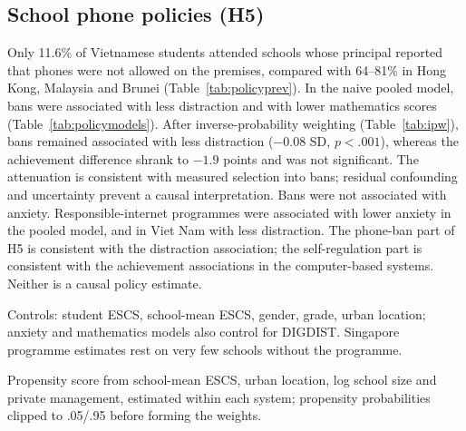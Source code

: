 \documentclass[preprint,12pt,authoryear,nonatbib]{elsarticle}
\begin{document}
\subsection{School phone policies (H5)}
Only 11.6\% of Vietnamese students attended schools whose principal reported that phones were not allowed on the premises, compared with 64--81\% in Hong Kong, Malaysia and Brunei (Table~\ref{tab:policyprev}). In the naive pooled model, bans were associated with less distraction and with lower mathematics scores (Table~\ref{tab:policymodels}). After inverse-probability weighting (Table~\ref{tab:ipw}), bans remained associated with less distraction ($-0.08$ SD, $p<.001$), whereas the achievement difference shrank to $-1.9$ points and was not significant. The attenuation is consistent with measured selection into bans; residual confounding and uncertainty prevent a causal interpretation. Bans were not associated with anxiety. Responsible-internet programmes were associated with lower anxiety in the pooled model, and in Viet Nam with less distraction. The phone-ban part of H5 is consistent with the distraction association; the self-regulation part is consistent with the achievement associations in the computer-based systems. Neither is a causal policy estimate.

\begin{table}[H]\centering\footnotesize
\caption{Students in schools with each device policy, PISA 2022 (\%)}\label{tab:policyprev}

\end{table}

\begin{table}[H]\centering\scriptsize
\caption{School policies and student outcomes, regression adjustment (SE in parentheses)}\label{tab:policymodels}

\par\smallskip\raggedright\footnotesize Controls: student ESCS, school-mean ESCS, gender, grade, urban location; anxiety and mathematics models also control for DIGDIST. Singapore programme estimates rest on very few schools without the programme.
\end{table}

\begin{table}[H]\centering\footnotesize
\caption{School phone bans: pooled estimates with inverse-probability weighting (13 systems, system fixed effects)}\label{tab:ipw}

\par\smallskip\raggedright\footnotesize Propensity score from school-mean ESCS, urban location, log school size and private management, estimated within each system; propensity probabilities clipped to .05/.95 before forming the weights.
\end{table}
\end{document}
